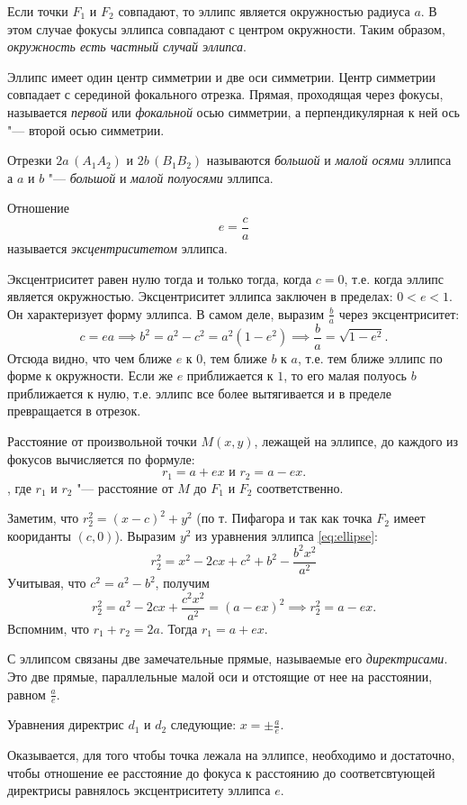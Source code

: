 Если точки $F_1$ и $F_2$ совпадают, то эллипс является окружностью радиуса $a$. В этом случае фокусы эллипса совпадают с центром окружности. Таким образом, \textit{окружность есть частный случай эллипса}.

Эллипс имеет один центр симметрии и две оси симметрии. Центр симметрии совпадает с серединой фокального отрезка. Прямая, проходящая через фокусы, называется \textit{первой} или \textit{фокальной} осью симметрии, а перпендикулярная к ней ось "--- второй осью симметрии.

Отрезки $2a \, (A_1A_2)$ и $2b \, (B_1B_2)$ называются \textit{большой} и \textit{малой осями} эллипса а $a$ и $b$ "--- \textit{большой} и \textit{малой полуосями} эллипса.

Отношение
$$
  e = \frac{c}{a}
$$ называется \textit{эксцентриситетом} эллипса.

Эксцентриситет равен нулю тогда и только тогда, когда $c = 0$, т.е. когда
эллипс является окружностью. Эксцентриситет эллипса заключен в пределах: $0 < e < 1$. Он характеризует форму эллипса. В самом деле, выразим $\frac{b}{a}$ через эксцентриситет:
$$
  c = ea \implies b^2 = a^2 - c^2 = a^2(1 - e^2) \implies \frac{b}{a} = \sqrt{1 - e^2}.
$$
Отсюда видно, что чем ближе $e$ к $0$, тем ближе $b$ к $a$, т.е. тем ближе эллипс
по форме к окружности. Если же $e$ приближается к $1$, то его малая полуось $b$ приближается к нулю, т.е. эллипс все более вытягивается и в пределе превращается в отрезок.
\begin{theorem}
  Расстояние от произвольной точки $M(x,y)$, лежащей на эллипсе, до каждого из фокусов вычисляется по формуле: 
  $$
    r_1 = a + ex \text{ и } r_2 = a - ex.
  $$, где $r_1$ и $r_2$ "--- расстояние от $M$ до $F_1$ и $F_2$ соответственно.
\end{theorem}
\begin{Proof}
  Заметим, что $r_2^2 = (x - c)^2 + y^2$ (по т. Пифагора и так как точка $F_2$ имеет коориданты $(c,0)$). Выразим $y^2$ из уравнения эллипса \ref{eq:ellipse}:
  $$
    r_2^2 = x^2 - 2cx + c^2 + b^2 - \frac{b^2x^2}{a^2}
  $$
  Учитывая, что $c^2 = a^2 - b^2$, получим
  $$
    r_2^2 = a^2 - 2cx + \frac{c^2x^2}{a^2} = (a - ex)^2 \implies r_2^2 = a - ex.
  $$
  Вспомним, что $r_1 + r_2 = 2a$. Тогда $r_1 = a + ex$.
\end{Proof}

\begin{definition}
  С эллипсом связаны две замечательные прямые, называемые его \textit{директрисами}. Это две прямые, параллельные  малой оси и отстоящие от нее на расстоянии, равном $\frac{a}{e}$. 
  
  Уравнения директрис $d_1$ и $d_2$ следующие: $x = \pm \frac{a}{e}$.
\end{definition}
Оказывается, для того чтобы точка лежала на эллипсе, необходимо и достаточно, чтобы отношение ее расстояние до фокуса к расстоянию до соответсвтующей директрисы равнялось эксцентриситету эллипса $e$.

